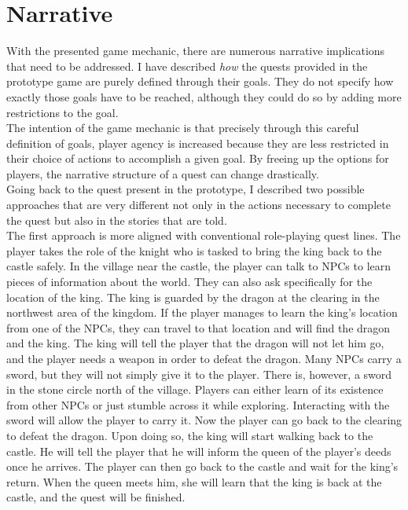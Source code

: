\section{Narrative}
With the presented game mechanic, there are numerous narrative implications that need to be addressed. I have described \textit{how} the quests provided in the prototype game are purely defined through their goals. They do not specify how exactly those goals have to be reached, although they could do so by adding more restrictions to the goal.\\
The intention of the game mechanic is that precisely through this careful definition of goals, player agency is increased because they are less restricted in their choice of actions to accomplish a given goal. By freeing up the options for players, the narrative structure of a quest can change drastically.\\
Going back to the quest present in the prototype, I described two possible approaches that are very different not only in the actions necessary to complete the quest but also in the stories that are told.\\
The first approach is more aligned with conventional role-playing quest lines. The player takes the role of the knight who is tasked to bring the king back to the castle safely. In the village near the castle, the player can talk to NPCs to learn pieces of information about the world. They can also ask specifically for the location of the king. The king is guarded by the dragon at the clearing in the northwest area of the kingdom. If the player manages to learn the king’s location from one of the NPCs, they can travel to that location and will find the dragon and the king. The king will tell the player that the dragon will not let him go, and the player needs a weapon in order to defeat the dragon. Many NPCs carry a sword, but they will not simply give it to the player. There is, however, a sword in the stone circle north of the village. Players can either learn of its existence from other NPCs or just stumble across it while exploring. Interacting with the sword will allow the player to carry it. Now the player can go back to the clearing to defeat the dragon. Upon doing so, the king will start walking back to the castle. He will tell the player that he will inform the queen of the player’s deeds once he arrives. The player can then go back to the castle and wait for the king's return. When the queen meets him, she will learn that the king is back at the castle, and the quest will be finished.\\
